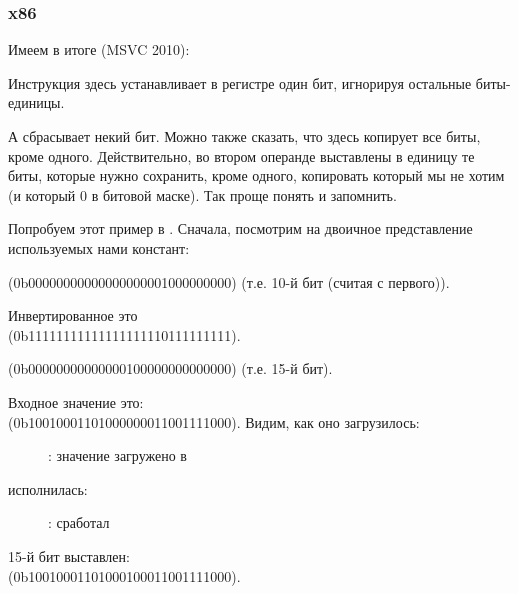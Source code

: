 \subsubsection{x86}


Имеем в итоге (MSVC 2010):



Инструкция \OR здесь устанавливает в регистре один бит, игнорируя остальные биты-единицы.

А \AND сбрасывает некий бит. Можно также сказать, что \AND здесь копирует все биты, кроме одного. 
Действительно, во втором операнде \AND выставлены в единицу те биты, которые нужно сохранить, 
кроме одного, копировать который мы не хотим (и который 0 в битовой маске).
Так проще понять и запомнить.

\clearpage
\mysubparagraph{\olly}

Попробуем этот пример в \olly.
Сначала, посмотрим на двоичное представление используемых нами констант:

 (0b0000000000000000000{\color{red}1}000000000) (т.е. 10-й бит (считая с первого)).

Инвертированное  это \\
(0b1111111111111111111{\color{red}0}111111111).

 (0b00000000000000{\color{red}1}00000000000000) (т.е. 15-й бит).

Входное значение это:  \\
(0b10010001101000000011001111000).
Видим, как оно загрузилось:

\begin{figure}[H]
\centering
{}
\caption{\olly: значение загружено в \ECX}
\label{fig:set_reset_olly1}
\end{figure}

\clearpage
\OR исполнилась:

\begin{figure}[H]
\centering
{}
\caption{\olly: \OR сработал}
\label{fig:set_reset_olly2}
\end{figure}

15-й бит выставлен: \\ 
(0b10010001101000{\color{red}1}00011001111000).

